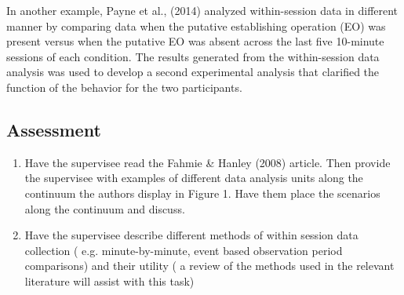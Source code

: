In another example, Payne et al., (2014) analyzed within-session data in different manner by comparing data when the putative establishing operation (EO) was present versus when the putative EO was absent across the last five 10-minute sessions of each condition. The results generated from the within-session data analysis was used to develop a second experimental analysis that clarified the function of the behavior for the two participants.
%
\subsection{Assessment}
\begin{enumerate}
\item Have the supervisee read the Fahmie \& Hanley (2008) article. Then provide the supervisee with examples of different data analysis units along the continuum the authors display in Figure 1. Have them place the scenarios along the continuum and discuss. 
\item Have the supervisee describe different methods of within session data collection ( e.g. minute-by-minute, event based observation period comparisons) and their utility ( a review of the methods used in the relevant literature will assist with this task)
%
\end{enumerate}
%
